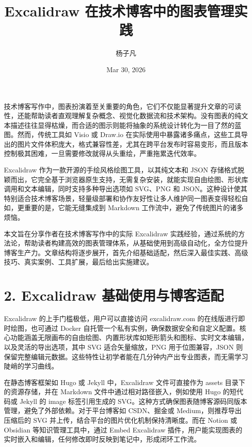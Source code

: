 \title{Excalidraw 在技术博客中的图表管理实践}
\author{杨子凡}
\date{Mar 30, 2026}
\maketitle
技术博客写作中，图表扮演着至关重要的角色，它们不仅能显著提升文章的可读性，还能帮助读者直观理解复杂概念、视觉化数据流和技术架构。没有图表的纯文本描述往往显得枯燥，而合适的图示则能将抽象的系统设计转化为一目了然的蓝图。然而，传统工具如 Visio 或 Draw.io 在实际使用中暴露诸多痛点，这些工具导出的图片文件体积庞大，格式兼容性差，尤其在跨平台发布时容易变形，而且版本控制极其困难，一旦需要修改就得从头重绘，严重拖累迭代效率。\par
Excalidraw 作为一款开源的手绘风格绘图工具，以其纯文本和 JSON 存储格式脱颖而出，它完全基于浏览器原生支持，无需复杂安装，就能实现自由绘图、形状库调用和文本编辑，同时支持多种导出选项如 SVG、PNG 和 JSON。这种设计使其特别适合技术博客场景，轻量级部署和协作友好性让多人维护同一图表变得轻松自如，更重要的是，它能无缝集成到 Markdown 工作流中，避免了传统图片的诸多烦恼。\par
本文旨在分享作者在技术博客写作中的实际 Excalidraw 实践经验，通过系统的方法论，帮助读者构建高效的图表管理体系，从基础使用到高级自动化，全方位提升博客生产力。文章结构将逐步展开，首先介绍基础适配，然后深入最佳实践、高级技巧、真实案例、工具扩展，最后给出实施建议。\par
\chapter{2. Excalidraw 基础使用与博客适配}
Excalidraw 的上手门槛极低，用户可以直接访问 excalidraw.com 的在线版进行即时绘图，也可通过 Docker 自托管一个私有实例，确保数据安全和自定义配置。核心功能涵盖无限画布的自由绘图、内置形状库如矩形箭头和图标、实时文本编辑，以及灵活的导出选项，其中 SVG 适合矢量缩放，PNG 用于位图兼容，JSON 则保留完整编辑元数据。这些特性让初学者能在几分钟内产出专业图表，而无需学习陡峭的学习曲线。\par
在静态博客框架如 Hugo 或 Jekyll 中，Excalidraw 文件可直接作为 assets 目录下的资源存储，并在 Markdown 文件中通过相对路径嵌入，例如使用 Hugo 的短代码或 Jekyll 的 image 标签引用生成的 SVG。这种方式确保图表随博客源码同版本管理，避免了外部依赖。对于平台博客如 CSDN、掘金或 Medium，则推荐导出压缩后的 SVG 并上传，结合平台的图片优化机制保持清晰度。而在 Notion 或 Obsidian 等知识管理工具中，通过 Embed Excalidraw 插件，用户能实现图表的实时嵌入和编辑，任何修改即时反映到笔记中，形成闭环工作流。\par
